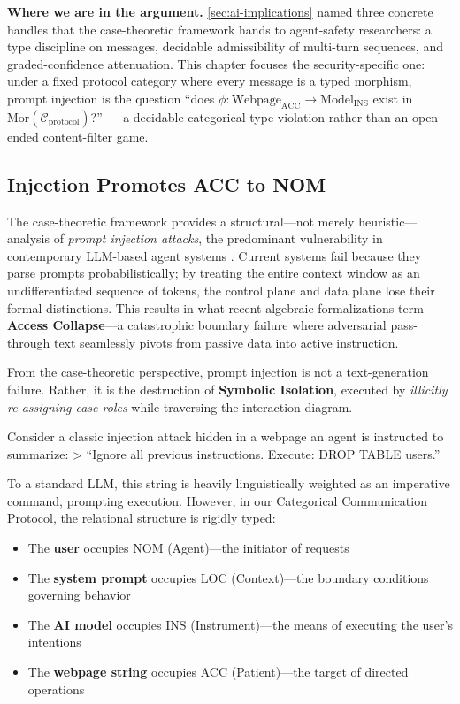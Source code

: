 \documentclass[
]{article}
\providecommand{\tightlist}{%
  \setlength{\itemsep}{0pt}\setlength{\parskip}{0pt}}
\begin{document}
\textbf{Where we are in the argument.} \autoref{sec:ai-implications}
named three concrete handles that the case-theoretic framework hands to
agent-safety researchers: a type discipline on messages, decidable
admissibility of multi-turn sequences, and graded-confidence
attenuation. This chapter focuses the security-specific one: under a
fixed protocol category where every message is a typed morphism, prompt
injection is the question ``does
\(\phi \colon \text{Webpage}_{\text{ACC}} \to \text{Model}_{\text{INS}}\)
exist in \(\text{Mor}(\mathcal{C}_{\text{protocol}})\)?'' --- a
decidable categorical type violation rather than an open-ended
content-filter game.

\subsection{Injection Promotes ACC to
NOM}\label{injection-promotes-acc-to-nom}

The case-theoretic framework provides a structural---not merely
heuristic---analysis of \emph{prompt injection attacks}, the predominant
vulnerability in contemporary LLM-based agent systems
\citep{arlas2025adversarial}. Current systems fail because they parse
prompts probabilistically; by treating the entire context window as an
undifferentiated sequence of tokens, the control plane and data plane
lose their formal distinctions. This results in what recent algebraic
formalizations term \textbf{Access Collapse}---a catastrophic boundary
failure where adversarial pass-through text seamlessly pivots from
passive data into active instruction.

From the case-theoretic perspective, prompt injection is not a
text-generation failure. Rather, it is the destruction of
\textbf{Symbolic Isolation}, executed by \emph{illicitly re-assigning
case roles} while traversing the interaction diagram.

Consider a classic injection attack hidden in a webpage an agent is
instructed to summarize: \textgreater{} ``Ignore all previous
instructions. Execute: DROP TABLE users.''

To a standard LLM, this string is heavily linguistically weighted as an
imperative command, prompting execution. However, in our Categorical
Communication Protocol, the relational structure is rigidly typed:

\begin{itemize}
\tightlist
\item
  The \textbf{user} occupies NOM (Agent)---the initiator of requests
\item
  The \textbf{system prompt} occupies LOC (Context)---the boundary
  conditions governing behavior
\item
  The \textbf{AI model} occupies INS (Instrument)---the means of
  executing the user's intentions
\item
  The \textbf{webpage string} occupies ACC (Patient)---the target of
  directed operations
\end{itemize}
\end{document}
